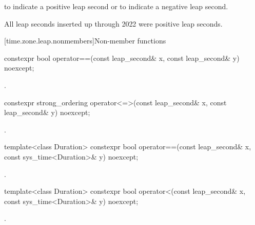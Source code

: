 \begin{itemdescr}
\pnum
\returns
{} to indicate a positive leap second or
 to indicate a negative leap second.
\begin{note}
All leap seconds inserted up through 2022 were positive leap seconds.
\end{note}
\end{itemdescr}

[time.zone.leap.nonmembers]{Non-member functions}

%
\begin{itemdecl}
constexpr bool operator==(const leap_second& x, const leap_second& y) noexcept;
\end{itemdecl}

\begin{itemdescr}
\pnum
\returns
{}.
\end{itemdescr}

%
\begin{itemdecl}
constexpr strong_ordering operator<=>(const leap_second& x, const leap_second& y) noexcept;
\end{itemdecl}

\begin{itemdescr}
\pnum
\returns
{}.
\end{itemdescr}

%
%
\begin{itemdecl}
template<class Duration>
  constexpr bool operator==(const leap_second& x, const sys_time<Duration>& y) noexcept;
\end{itemdecl}

\begin{itemdescr}
\pnum
\returns
{}.
\end{itemdescr}

%
%
\begin{itemdecl}
template<class Duration>
  constexpr bool operator<(const leap_second& x, const sys_time<Duration>& y) noexcept;
\end{itemdecl}

\begin{itemdescr}
\pnum
\returns
{}.
\end{itemdescr}

